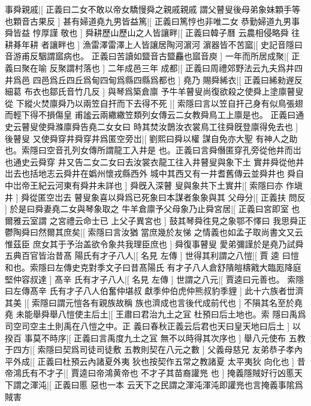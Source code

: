 事舜親戚|[%
正義曰二女不敢以帝女驕慢舜之親戚親戚%
謂父瞽叟後母弟象妹顆手等也顆音古果反%
]%
甚有婦道堯九男皆益篤|[%
正義曰篤悙也非唯二女%
恭勤婦道九男事舜皆益%
%
悙厚謹%
敬也%
]%
舜耕歷山歷山之人皆讓畔|[%
正義曰韓子曆%
云農相侵略舜%
%
往耕朞年耕%
者讓畔也%
]%
漁雷澤雷澤上人皆讓居陶河濵河%
濵器皆不苦窳|[%
史記音隱曰音游甫反駰謂寙病也。%
正義曰苦讀如盬音古盬麤也寙音庾%
]%
一年而所居成聚|[%
正義曰聚在喻%
反聚謂村落也%
]%
二年成邑三年%
成都|[%
正義曰周禮郊野法云九夫爲井四井爲邑%
四邑爲丘四丘爲甸四甸爲縣四縣爲都也%
]%
堯乃%
賜舜絺衣|[%
正義曰絺勑遟反細葛%
布衣也鄒氏音竹几反%
]%
與琴爲築倉廪%
予牛羊瞽叟尚復欲殺之使舜上塗廪瞽叟從%
下縱火焚廪舜乃以兩笠自扞而下去得不死%
|[%
索隱曰言以笠自扞己身有似鳥張翅而輕下得不損傷皇%
甫謐云兩繖繖笠類列女傳云二女教舜鳥工上廪是也。%
%
正義曰通史云瞽叟使舜滌廪舜告堯二女女曰%
時其焚汝鵲汝衣裳鳥工往舜旣登廪得免去也%
]%
後瞽叟%
又使舜穿井舜穿井爲匿空旁岀|[%
劉熙曰舜以權%
謀自免亦大聖%
%
有神人之助也。索隱曰空音孔列女傳所謂龍工入井是%
也。正義曰言舜僭匿穿孔旁從他井而岀也通史云舜穿%
%
井又告二女二女曰去汝裳衣龍工往入井瞽叟與象下土%
實井舜從他井岀去也括地志云舜井在嬀州懷戎縣西外%
%
城中其西又有一井耆舊傳云並舜井也%
舜自中岀帝王紀云河東有舜井未詳也%
]%
舜旣入深瞽%
叟與象共下土實井|[%
索隱曰亦%
作塡井%
]%
舜從匿空岀去%
瞽叟象喜以舜爲已死象曰本謀者象象與其%
父母分|[%
正義扶%
問反%
]%
於是曰舜妻堯二女與琴象取之%
牛羊倉廪予父母象乃止舜宮居|[%
正義曰宮即室%
也爾雅云室謂%
%
之宮禮云命士已%
上父子異宮也%
]%
鼓其琴舜徃見之象鄂不懌曰%
我思舜正鬱陶舜曰然爾其庶矣|[%
索隱曰言汝猶%
當庶幾於友悌%
%
之情義也如孟子取尚書文又云惟茲臣%
庶女其于予治盖欲令象共我理臣庶也%
]%
舜復事瞽叟%
愛弟彌謹於是堯乃試舜五典百官皆治昔髙%
陽氏有才子八人|[%
名見%
左傳%
]%
世得其利謂之八愷|[%
賈%
逵%
%
曰愷和也。索隱曰左傳史克對季文子曰昔髙陽氏%
有才子八人倉舒隤皚檮戭大臨厖降庭堅仲容叔達%
]%
髙辛%
氏有才子八人|[%
名見%
左傳%
]%
世謂之八元|[%
賈逵曰元善也。%
索隱曰左傳髙辛%
%
氏有才子八人伯奮仲堪叔%
獻季仲伯虎仲熊叔豹季貍%
]%
此十六族者丗濟其美%
|[%
索隱曰謂元愷各有親族故稱%
族也濟成也言後代成前代也%
]%
不隕其名至於堯堯%
未能舉舜舉八愷使主后土|[%
王肅曰君治九土之冝%
杜預曰后土地也。索%
%
隱曰禹爲司空司空主土則禹在八愷之中。正%
義曰春秋正義云后君也天曰皇天地曰后土%
]%
以揆百%
事莫不時序|[%
正義曰言禹度九土之冝%
無不以時得其次序也%
]%
舉八元使布%
五教于四方|[%
索隱曰契爲司徒司徒敷%
五教則契在八元之數%
]%
父義母慈兄%
友弟恭子孝內平外成|[%
正義曰杜預云內諸夏外夷%
狄也按契作五常之教諸夏%
%
太平夷狄%
向化也%
]%
昔帝鴻氏有不才子|[%
賈逵曰帝鴻黄帝也%
不才子其苗裔讙兠%
%
也%
%
]%
掩義隱賊好行凶慝天下謂之渾沌|[%
正義曰慝%
惡也一本%
%
云天下之民謂之渾沌渾沌即讙兠也言掩義事隂爲賊害%
